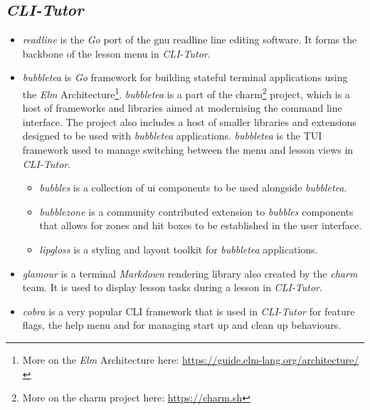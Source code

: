 \subsection{\textit{CLI-Tutor}}
\begin{itemize}
    \item \textit{readline} is the \textit{Go} port of the gnu readline
        \cite{ramey_fox_readline} line editing software. It forms the backbone
        of the lesson menu in \textit{CLI-Tutor}.

    \item \textit{bubbletea} is \textit{Go} framework for building stateful terminal
        applications using the \textit{Elm} Architecture\footnote{More on the \textit{Elm}
        Architecture here: \url{https://guide.elm-lang.org/architecture/}}.
        \textit{bubbletea} is a part of the charm\footnote{More on the charm
        project here: \url{https://charm.sh}} project, which is a host of
        frameworks and libraries aimed at modernising the command line
        interface. The project also includes a host of smaller libraries and
        extensions designed to be used with \textit{bubbletea}
        applications. \textit{bubbletea} is the TUI framework used to manage
        switching between the menu and lesson views in \textit{CLI-Tutor}.

        \begin{itemize}
            \item \textit{bubbles} is a collection of ui components to be used alongside \textit{bubbletea}.
            \item \textit{bubblezone} is a community contributed extension to
                \textit{bubbles} components that allows for zones and hit boxes
                to be established in the user interface.
            \item \textit{lipgloss} is a styling and layout toolkit for \textit{bubbletea} applications.
        \end{itemize}

    \item \textit{glamour} is a terminal \textit{Markdown} rendering library also 
        created by the \textit{charm} team. It is used to display lesson tasks
        during a lesson in \textit{CLI-Tutor}.

    \item \textit{cobra} is a very popular CLI framework that is used in
        \textit{CLI-Tutor} for feature flags, the help menu and for managing
        start up and clean up behaviours.
        

\end{itemize}
